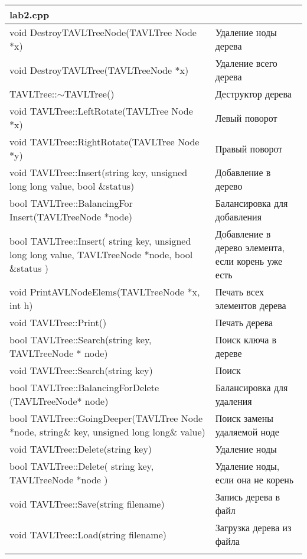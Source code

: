 \begin{longtable}{|p{7.5cm}|p{7.5cm}|}
\hline
\rowcolor{lightgray}
\multicolumn{2}{|c|} {lab2.cpp}\\
\hline
void DestroyTAVLTreeNode(TAVLTree
Node *x)& Удаление ноды дерева\\
\hline
void DestroyTAVLTree(TAVLTreeNode *x)& Удаление всего дерева\\
\hline
TAVLTree::$\sim$TAVLTree() & Деструктор дерева\\
\hline
void TAVLTree::LeftRotate(TAVLTree
Node *x)& Левый поворот\\
\hline
void TAVLTree::RightRotate(TAVLTree
Node *y)& Правый поворот\\
\hline
void TAVLTree::Insert(string key, 
unsigned long long value, 
bool \&status)& Добавление в дерево\\
\hline
bool TAVLTree::BalancingFor
Insert(TAVLTreeNode *node)& Балансировка для добавления\\
\hline
bool TAVLTree::Insert( string key, 
unsigned long long value, 
TAVLTreeNode *node, bool \&status )& Добавление в дерево элемента, если
корень уже есть\\
\hline
void PrintAVLNodeElems(TAVLTreeNode *x, 
int h)& Печать всех элементов дерева\\
\hline
void TAVLTree::Print()& Печать дерева\\
\hline
bool TAVLTree::Search(string key, 
TAVLTreeNode * node)& Поиск ключа в дереве\\
\hline
void TAVLTree::Search(string key)& Поиск\\
\hline
bool TAVLTree::BalancingForDelete
(TAVLTreeNode* node)& Балансировка для удаления\\
\hline
bool TAVLTree::GoingDeeper(TAVLTree
Node *node, string\& key, 
unsigned long long\& value)& Поиск замены удаляемой ноде\\
\hline
void TAVLTree::Delete(string key)& Удаление ноды\\
\hline
bool TAVLTree::Delete( string key, 
TAVLTreeNode *node )& Удаление ноды, если она не корень\\
\hline
void TAVLTree::Save(string filename)& Запись дерева в файл\\
\hline
void TAVLTree::Load(string filename)& Загрузка дерева из файла\\
\hline
\rowcolor{lightgray}
\hline
\end{longtable}

